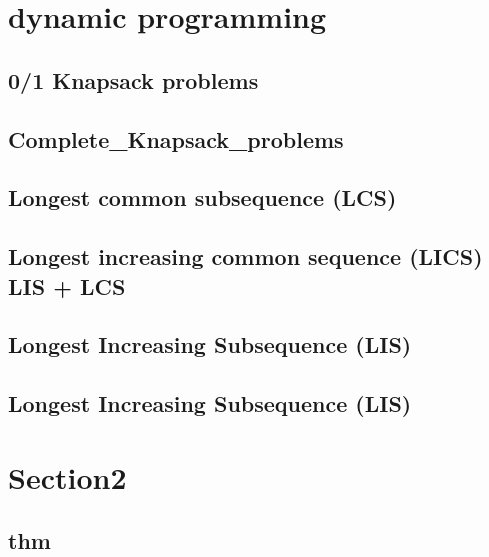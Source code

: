 \section{dynamic programming}
    \subsection{0/1 Knapsack problems}
        

    \subsection{Complete_Knapsack_problems}
        

    \subsection{Longest common subsequence (LCS)}
        

    \subsection{Longest increasing common sequence (LICS) LIS + LCS}
        

    \subsection{Longest Increasing Subsequence (LIS)}
        
    \subsection{Longest Increasing Subsequence (LIS)}
        

\section{Section2}
    \subsection{thm}
        